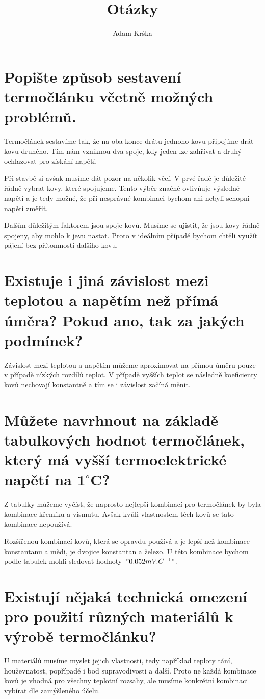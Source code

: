 \documentclass[12pt,a4paper]{seminarka}
\author{Adam Krška}
\title{Otázky}
\begin{document}
\section{Popište způsob sestavení termočlánku včetně možných problémů.}
Termočlánek sestavíme tak, že na oba konce drátu jednoho kovu připojíme
drát kovu druhého. Tím nám vzniknou dva spoje, kdy jeden lze zahřívat a druhý
ochlazovat pro získání napětí.

Při stavbě si avšak musíme dát pozor na několik věcí. V prvé řadě je důležité
řádně vybrat kovy, které spojujeme. Tento výběr značně ovlivňuje výsledné
napětí a je tedy možné, že při nesprávné kombinaci bychom ani nebyli schopni
napětí změřit.

Dalším důležitým faktorem jsou spoje kovů. Musíme se ujistit, že jsou kovy
řádně spojeny, aby mohlo k jevu nastat. Proto v ideálním případě bychom chtěli
využít pájení bez přítomnosti dalšího kovu.

\section{Existuje i jiná závislost mezi teplotou a napětím než přímá úměra?
Pokud ano, tak za jakých podmínek?}
Závislost mezi teplotou a napětím můžeme aproximovat na přímou úměru pouze
v případě nízkých rozdílů teplot. V případě vyšších teplot se následně
koeficienty kovů nechovají konstantně a tím se i závislost začíná měnit.

\section{Můžete navrhnout na základě tabulkových hodnot termočlánek, který má
vyšší termoelektrické napětí na $\mathbf{1 ^\circ C}$?}
Z tabulky můžeme vyčíst, že naprosto nejlepší kombinací pro termočlánek
by byla kombinace křemíku a vismutu. Avšak kvůli vlastnostem těch kovů se tato
kombinace nepoužívá.

Rozšířenou kombinací kovů, která se opravdu používá a je lepší než kombinace
konstantanu a mědi, je dvojice konstantan a železo. U této kombinace bychom
podle tabulek mohli sledovat hodnoty~$"0.052 mV.C^{-1}"$.

\section{Existují nějaká technická omezení pro použití různých materiálů k
výrobě termočlánku?}
U materiálů musíme myslet jejich vlastnosti, tedy například teploty tání,
houževnatost, popřípadě i bod supravodivosti a další. Proto ne každá kombinace
kovů je vhodná pro všechny teplotní rozsahy, ale musíme konkrétní kombinaci
vybírat dle zamýšleného účelu.
\end{document}
